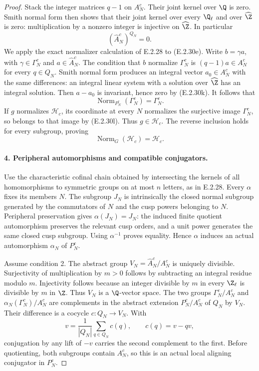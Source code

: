 \begin{proof}
Stack the integer matrices \(q-1\) on \(A_N^c\). Their
joint kernel over \(\Q\) is zero. Smith normal form then
shows that their joint kernel over every \(\Q_\ell\) and
over \(\widehat\Z\) is zero: multiplication by a nonzero
integer is injective on \(\widehat\Z\). In particular
\[
 (\widehat A_N^c)^{Q_N}=0.
\tag{E.2.30k}
\]
We apply the exact normalizer calculation of E.2.28 to
(E.2.30e). Write \(b=\gamma a\), with
\(\gamma\in\Gamma_N^c\) and \(a\in\widehat A_N^c\).
The condition that \(b\) normalize \(\Gamma_N^c\) is
\((q-1)a\in A_N^c\) for every \(q\in Q_N\). Smith normal
form produces an integral vector \(a_0\in A_N^c\) with
the same differences: an integral linear system with a
solution over \(\widehat\Z\) has an integral solution.
Then \(a-a_0\) is invariant, hence zero by (E.2.30k).
It follows that
\[
 \operatorname{Norm}_{P_N^c}(\Gamma_N^c)=\Gamma_N^c.
\tag{E.2.30l}
\]
If \(g\) normalizes \(\mathcal H_c\), its coordinate at
every \(N\) normalizes the surjective image \(\Gamma_N^c\),
so belongs to that image by (E.2.30l). Thus \(g\in\mathcal H_c\).
The reverse inclusion holds for every subgroup, proving
\[
 \operatorname{Norm}_G(\mathcal H_c)=\mathcal H_c.
\tag{E.2.30m}
\]

\paragraph{4. Peripheral automorphisms and compatible conjugators.}
Use the characteristic cofinal chain obtained by intersecting
the kernels of all homomorphisms to symmetric groups on at
most \(n\) letters, as in E.2.28. Every \(\alpha\) fixes
its members \(N\). The subgroup \(J_N\) is intrinsically
the closed normal subgroup generated by the commutators of
\(N\) and the cusp powers belonging to \(N\). Peripheral
preservation gives \(\alpha(J_N)=J_N\): the induced finite
quotient automorphism preserves the relevant cusp orders,
and a unit power generates the same closed cusp subgroup.
Using \(\alpha^{-1}\) proves equality. Hence \(\alpha\)
induces an actual automorphism \(\alpha_N\) of \(P_N^c\).

Assume condition 2. The abstract group
\(V_N=\widehat A_N^c/A_N^c\) is uniquely divisible.
Surjectivity of multiplication by \(m>0\) follows by
subtracting an integral residue modulo \(m\). Injectivity
follows because an integer divisible by \(m\) in every
\(\Z_\ell\) is divisible by \(m\) in \(\Z\).
Thus \(V_N\) is a \(\Q\)-vector space.
The two groups \(\Gamma_N^c/A_N^c\) and
\(\alpha_N(\Gamma_N^c)/A_N^c\) are complements in the
abstract extension \(P_N^c/A_N^c\) of \(Q_N\) by \(V_N\).
Their difference is a cocycle \(c:Q_N\to V_N\). With
\[
 v=\frac{1}{|Q_N|}\sum_{q\in Q_N}c(q),
 \qquad c(q)=v-qv,
\]
conjugation by any lift of \(-v\) carries the second
complement to the first. Before quotienting, both subgroups
contain \(A_N^c\), so this is an actual local aligning
conjugator in \(P_N^c\).


\end{proof}
